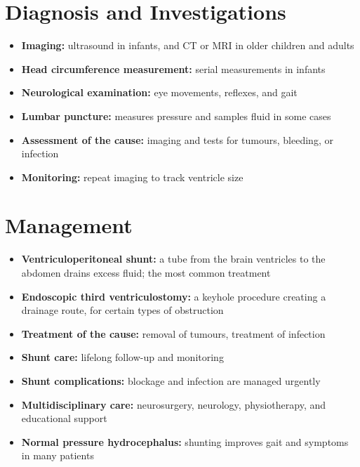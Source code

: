 \section*{Diagnosis and Investigations}
\begin{itemize}
    \item \textbf{Imaging:} ultrasound in infants, and CT or MRI in older children and adults
    \item \textbf{Head circumference measurement:} serial measurements in infants
    \item \textbf{Neurological examination:} eye movements, reflexes, and gait
    \item \textbf{Lumbar puncture:} measures pressure and samples fluid in some cases
    \item \textbf{Assessment of the cause:} imaging and tests for tumours, bleeding, or infection
    \item \textbf{Monitoring:} repeat imaging to track ventricle size
\end{itemize}

\section*{Management}
\begin{itemize}
    \item \textbf{Ventriculoperitoneal shunt:} a tube from the brain ventricles to the abdomen drains excess fluid; the most common treatment
    \item \textbf{Endoscopic third ventriculostomy:} a keyhole procedure creating a drainage route, for certain types of obstruction
    \item \textbf{Treatment of the cause:} removal of tumours, treatment of infection
    \item \textbf{Shunt care:} lifelong follow-up and monitoring
    \item \textbf{Shunt complications:} blockage and infection are managed urgently
    \item \textbf{Multidisciplinary care:} neurosurgery, neurology, physiotherapy, and educational support
    \item \textbf{Normal pressure hydrocephalus:} shunting improves gait and symptoms in many patients
\end{itemize}


